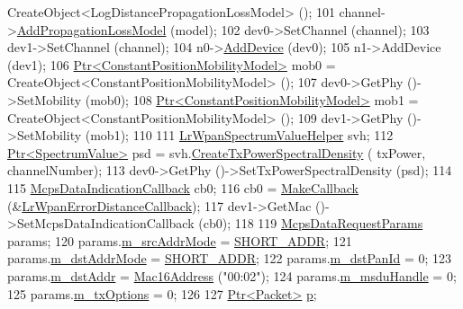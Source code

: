 \begin{DoxyCode}
      CreateObject<LogDistancePropagationLossModel> ();
101   channel->\hyperlink{classns3_1_1MultiModelSpectrumChannel_ae458452bac17bd605b6e2f8f0fd58b29}{AddPropagationLossModel} (model);
102   dev0->SetChannel (channel);
103   dev1->SetChannel (channel);
104   n0->\hyperlink{classns3_1_1Node_a42ff83ee1d5d1649c770d3f5b62375de}{AddDevice} (dev0);
105   n1->AddDevice (dev1);
106   \hyperlink{classns3_1_1Ptr}{Ptr<ConstantPositionMobilityModel>} mob0 = 
      CreateObject<ConstantPositionMobilityModel> ();
107   dev0->GetPhy ()->SetMobility (mob0);
108   \hyperlink{classns3_1_1Ptr}{Ptr<ConstantPositionMobilityModel>} mob1 = 
      CreateObject<ConstantPositionMobilityModel> ();
109   dev1->GetPhy ()->SetMobility (mob1);
110 
111   \hyperlink{classns3_1_1LrWpanSpectrumValueHelper}{LrWpanSpectrumValueHelper} svh;
112   \hyperlink{classns3_1_1Ptr}{Ptr<SpectrumValue>} psd = svh.\hyperlink{classns3_1_1LrWpanSpectrumValueHelper_af0ae8f605c101953da6475676047ae32}{CreateTxPowerSpectralDensity} (
      txPower, channelNumber);
113   dev0->GetPhy ()->SetTxPowerSpectralDensity (psd);
114 
115   \hyperlink{classns3_1_1Callback}{McpsDataIndicationCallback} cb0;
116   cb0 = \hyperlink{group__makecallbackmemptr_ga9376283685aa99d204048d6a4b7610a4}{MakeCallback} (&\hyperlink{lr-wpan-error-distance-plot_8cc_ab8c524d53619b411a9383d6bd742921d}{LrWpanErrorDistanceCallback});
117   dev1->GetMac ()->SetMcpsDataIndicationCallback (cb0);
118 
119   \hyperlink{structns3_1_1McpsDataRequestParams}{McpsDataRequestParams} params;
120   params.\hyperlink{structns3_1_1McpsDataRequestParams_a31f4c281d07cf3b5992d45416bd71309}{m\_srcAddrMode} = \hyperlink{group__lr-wpan_gga9ea4702ab11d5329e1593afebce06bbba7bf58267dde39bdabfeeb5793450c5e3}{SHORT\_ADDR};
121   params.\hyperlink{structns3_1_1McpsDataRequestParams_a5c5e8dd4d08bfcd24de430d38ea7cd78}{m\_dstAddrMode} = \hyperlink{group__lr-wpan_gga9ea4702ab11d5329e1593afebce06bbba7bf58267dde39bdabfeeb5793450c5e3}{SHORT\_ADDR};
122   params.\hyperlink{structns3_1_1McpsDataRequestParams_a6695c180dec55fbd39f883052040e003}{m\_dstPanId} = 0;
123   params.\hyperlink{structns3_1_1McpsDataRequestParams_a68e918ac117d0fe43d6b9541ae4347c5}{m\_dstAddr} = \hyperlink{classns3_1_1Mac16Address}{Mac16Address} (\textcolor{stringliteral}{"00:02"});
124   params.\hyperlink{structns3_1_1McpsDataRequestParams_a90a54f9a082876ebe872538c8b1ce6bc}{m\_msduHandle} = 0;
125   params.\hyperlink{structns3_1_1McpsDataRequestParams_ad20ec674a277222812523b3ebbc18d4c}{m\_txOptions} = 0;
126 
127   \hyperlink{classns3_1_1Ptr}{Ptr<Packet>} \hyperlink{lte__link__budget_8m_ac9de518908a968428863f829398a4e62}{p};

\end{DoxyCode}
